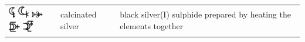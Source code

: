 \documentclass[british,final,landscape]{scrartcl}
\begin{document}
\begin{refsection}
\begin{supertabular}{p{0.3\textwidth}p{0.34\textwidth}p{0.34\textwidth}}
   \includegraphics[height=5mm]{Mixtures/CalcinatedSilver} \includegraphics[width=5mm]{Mixtures/CalcinatedSilver2} \includegraphics[width=5mm]{Mixtures/CalcinatedSilver3} \includegraphics[width=5mm]{Mixtures/CalcinatedSilver4} \includegraphics[width=5mm]{Mixtures/CalcinatedSilver5} & calcinated silver & black silver(I) sulphide  prepared by heating the elements together \\

\end{supertabular}
\end{refsection}
\end{document}
